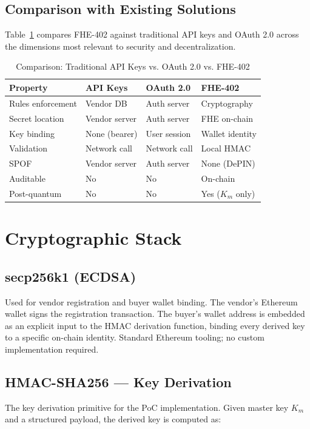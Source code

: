 \documentclass[conference]{IEEEtran}
\begin{document}
\subsection{Comparison with Existing Solutions}

Table~\ref{tab:comparison} compares FHE-402 against traditional API keys and OAuth 2.0
across the dimensions most relevant to security and decentralization.

\begin{table}[h]
\caption{Comparison: Traditional API Keys vs. OAuth 2.0 vs. FHE-402}
\label{tab:comparison}
\renewcommand{\arraystretch}{1.2}
\begin{tabular}{p{1.6cm}p{1.7cm}p{1.7cm}p{1.9cm}}
\toprule
\textbf{Property} & \textbf{API Keys} & \textbf{OAuth 2.0} & \textbf{FHE-402} \\
\midrule
Rules enforcement & Vendor DB & Auth server & Cryptography \\
Secret location & Vendor server & Auth server & FHE on-chain \\
Key binding & None (bearer) & User session & Wallet identity \\
Validation & Network call & Network call & Local HMAC \\
SPOF & Vendor server & Auth server & None (DePIN) \\
Auditable & No & No & On-chain \\
Post-quantum & No & No & Yes ($K_m$ only) \\
\bottomrule
\end{tabular}
\end{table}

\section{Cryptographic Stack}
\label{sec:crypto}

\subsection{secp256k1 (ECDSA)}
Used for vendor registration and buyer wallet binding. The vendor's Ethereum wallet
signs the registration transaction. The buyer's wallet address is embedded as an explicit
input to the HMAC derivation function, binding every derived key to a specific on-chain
identity. Standard Ethereum tooling; no custom implementation required.

\subsection{HMAC-SHA256 --- Key Derivation}
The key derivation primitive for the PoC implementation. Given master key $K_m$ and a
structured payload, the derived key is computed as:
\end{document}
